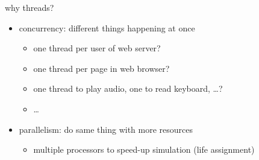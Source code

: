 
\begin{frame}{why threads?}
\begin{itemize}
\item concurrency: different things happening at once
    \begin{itemize}
    \item one thread per user of web server?
    \item one thread per page in web browser?
    \item one thread to play audio, one to read keyboard, \ldots?
    \item \ldots
    \end{itemize}
\item parallelism: do same thing with more resources
    \begin{itemize}
    \item multiple processors to speed-up simulation (life assignment)
    \end{itemize}
\end{itemize}
\end{frame}

